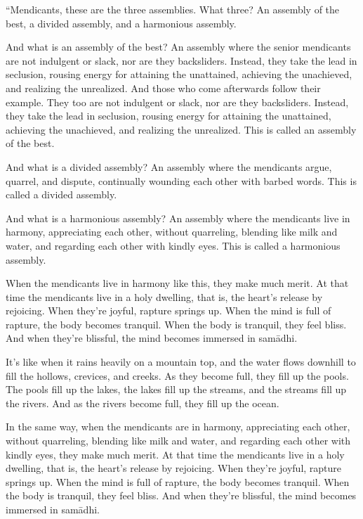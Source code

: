 \documentclass[12pt,openany]{book}%
\begin{document}
“Mendicants, these are the three assemblies. What three? An assembly of the best, a divided assembly, and a harmonious assembly. 

And what is an assembly of the best? An assembly where the senior mendicants are not indulgent or slack, nor are they backsliders. Instead, they take the lead in seclusion, rousing energy for attaining the unattained, achieving the unachieved, and realizing the unrealized. And those who come afterwards follow their example. They too are not indulgent or slack, nor are they backsliders. Instead, they take the lead in seclusion, rousing energy for attaining the unattained, achieving the unachieved, and realizing the unrealized. This is called an assembly of the best. 

And what is a divided assembly? An assembly where the mendicants argue, quarrel, and dispute, continually wounding each other with barbed words. This is called a divided assembly. 

And what is a harmonious assembly? An assembly where the mendicants live in harmony, appreciating each other, without quarreling, blending like milk and water, and regarding each other with kindly eyes. This is called a harmonious assembly. 

When the mendicants live in harmony like this, they make much merit. At that time the mendicants live in a holy dwelling, that is, the heart’s release by rejoicing. When they’re joyful, rapture springs up. When the mind is full of rapture, the body becomes tranquil. When the body is tranquil, they feel bliss. And when they’re blissful, the mind becomes immersed in \textsanskrit{samādhi}. 

It’s like when it rains heavily on a mountain top, and the water flows downhill to fill the hollows, crevices, and creeks. As they become full, they fill up the pools. The pools fill up the lakes, the lakes fill up the streams, and the streams fill up the rivers. And as the rivers become full, they fill up the ocean. 

In the same way, when the mendicants are in harmony, appreciating each other, without quarreling, blending like milk and water, and regarding each other with kindly eyes, they make much merit. At that time the mendicants live in a holy dwelling, that is, the heart’s release by rejoicing. When they’re joyful, rapture springs up. When the mind is full of rapture, the body becomes tranquil. When the body is tranquil, they feel bliss. And when they’re blissful, the mind becomes immersed in \textsanskrit{samādhi}. 
\end{document}
